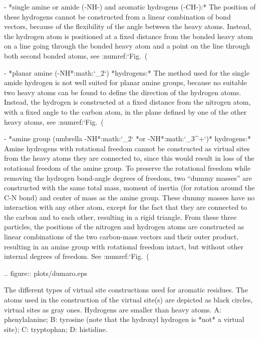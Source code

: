 -  *single amine or amide (-NH-) and aromatic hydrogens
   (-CH-):* 
   The position of these hydrogens cannot be
   constructed from a linear combination of bond vectors, because of the
   flexibility of the angle between the heavy atoms. Instead, the
   hydrogen atom is positioned at a fixed distance from the bonded heavy
   atom on a line going through the bonded heavy atom and a point on the
   line through both second bonded atoms, see
   :numref:`Fig. (%

-  *planar amine (-NH*:math:`_2`) *hydrogens:* The method
   used for the single amide hydrogen is not well suited for planar
   amine groups, because no suitable two heavy atoms can be found to
   define the direction of the hydrogen atoms. Instead, the hydrogen is
   constructed at a fixed distance from the nitrogen atom, with a fixed
   angle to the carbon atom, in the plane defined by one of the other
   heavy atoms, see :numref:`Fig. (%

-  *amine group (umbrella -NH*:math:`_2` *or
   -NH*:math:`_3^+`)* hydrogens:* Amine hydrogens with
   rotational freedom cannot be constructed as virtual sites from the
   heavy atoms they are connected to, since this would result in loss of
   the rotational freedom of the amine group. To preserve the rotational
   freedom while removing the hydrogen bond-angle degrees of freedom,
   two “dummy masses” are constructed with the same total mass, moment
   of inertia (for rotation around the C-N bond) and
   center of mass as the amine group. These dummy masses have no
   interaction with any other atom, except for the fact that they are
   connected to the carbon and to each other, resulting in a rigid
   triangle. From these three particles, the positions of the nitrogen
   and hydrogen atoms are constructed as linear combinations of the two
   carbon-mass vectors and their outer product, resulting in an amine
   group with rotational freedom intact, but without other internal
   degrees of freedom. See :numref:`Fig. (%

.. figure:: plots/dumaro.eps

   The different types of virtual site constructions used for aromatic
   residues. The atoms used in the construction of the virtual site(s)
   are depicted as black circles, virtual sites as gray ones. Hydrogens
   are smaller than heavy atoms. A: phenylalanine;
   B: tyrosine (note that the hydroxyl hydrogen is *not*
   a virtual site); C: tryptophan; D:
   histidine.

